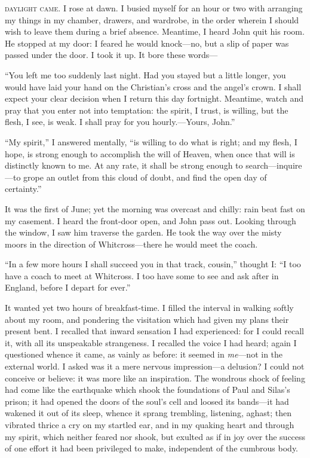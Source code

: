 
 \textsc{daylight came.} I rose at dawn. I busied myself for an hour or two
with arranging my things in my chamber, drawers, and wardrobe, in the
order wherein I should wish to leave them during a brief absence. 
Meantime, I heard \St{} John quit his room. He stopped at my door: I
feared he would knock---no, but a slip of paper was passed under the
door. I took it up. It bore these words---

\enquote{You left me too suddenly last night. Had you stayed but a little
longer, you would have laid your hand on the Christian's cross and the
angel's crown. I shall expect your clear decision when I return this
day fortnight. Meantime, watch and pray that you enter not into
temptation: the spirit, I trust, is willing, but the flesh, I see, is
weak. I shall pray for you hourly.---Yours, {\St{} John}.}

\enquote{My spirit,} I answered mentally, \enquote{is willing to do what
is right; and my flesh, I hope, is strong enough to accomplish the will
of Heaven, when once that will is distinctly known to me. At any rate,
it shall be strong enough to search---inquire---to grope an outlet from
this cloud of doubt, and find the open day of certainty.}

It was the first of June; yet the morning was overcast and chilly: rain
beat fast on my casement. I heard the front-door open, and \St{} John
pass out. Looking through the window, I saw him traverse the garden. 
He took the way over the misty moors in the direction of
Whitcross---there he would meet the coach.

\enquote{In a few more hours I shall succeed you in that track, cousin,}
thought I: \enquote{I too have a coach to meet at Whitcross. I too have
some to see and ask after in England, before I depart for ever.}

It wanted yet two hours of breakfast-time. I filled the interval in
walking softly about my room, and pondering the visitation which had
given my plans their present bent. I recalled that inward sensation I
had experienced: for I could recall it, with all its unspeakable
strangeness. I recalled the voice I had heard; again I questioned
whence it came, as vainly as before: it seemed in \emph{me}---not in the
external world. I asked was it a mere nervous impression---a delusion? 
I could not conceive or believe: it was more like an inspiration. The
wondrous shock of feeling had come like the earthquake which shook the
foundations of Paul and Silas's prison; it had opened the doors of the
soul's cell and loosed its bands---it had wakened it out of its sleep,
whence it sprang trembling, listening, aghast; then vibrated thrice a
cry on my startled ear, and in my quaking heart and through my spirit,
which neither feared nor shook, but exulted as if in joy over the
success of one effort it had been privileged to make, independent of the
cumbrous body.

